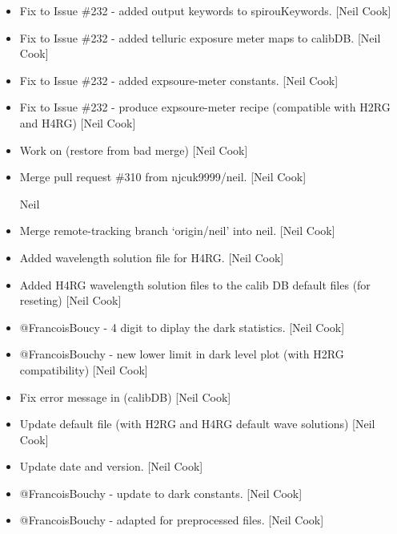 \documentclass[a4paper,10pt,english]{report}
\begin{document}
\begin{itemize}
\item {} 
Fix to Issue \#232 - added output keywords to spirouKeywords. {[}Neil
Cook{]}

\item {} 
Fix to Issue \#232 - added telluric exposure meter maps to calibDB.
{[}Neil Cook{]}

\item {} 
Fix to Issue \#232 - added expsoure-meter constants. {[}Neil Cook{]}

\item {} 
Fix to Issue \#232 - produce expsoure-meter recipe (compatible with
H2RG and H4RG) {[}Neil Cook{]}

\item {} 
Work on  (restore from bad merge) {[}Neil Cook{]}

\item {} 
Merge pull request \#310 from njcuk9999/neil. {[}Neil Cook{]}

Neil

\item {} 
Merge remote-tracking branch ‘origin/neil’ into neil. {[}Neil Cook{]}

\item {} 
Added wavelength solution file for H4RG. {[}Neil Cook{]}

\item {} 
Added H4RG wavelength solution files to the calib DB default files
(for reseting) {[}Neil Cook{]}

\item {} 
@FrancoisBoucy - 4 digit to diplay the dark statistics. {[}Neil Cook{]}

\item {} 
@FrancoisBouchy - new lower limit in dark level plot (with H2RG
compatibility) {[}Neil Cook{]}

\item {} 
Fix error message in  (calibDB) {[}Neil Cook{]}

\item {} 
Update default  file (with H2RG and H4RG default
wave solutions) {[}Neil Cook{]}

\item {} 
Update date and version. {[}Neil Cook{]}

\item {} 
@FrancoisBouchy - update to dark constants. {[}Neil Cook{]}

\item {} 
@FrancoisBouchy -  adapted for preprocessed files.
{[}Neil Cook{]}


\end{itemize}
\end{document}
